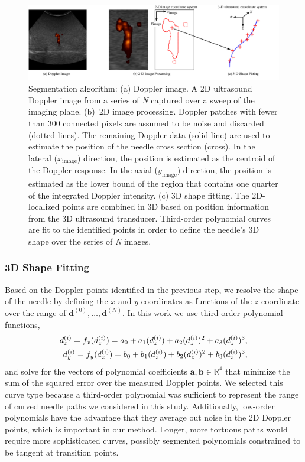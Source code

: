 \begin{figure}[!t]
\centering
\includegraphics[width = \textwidth]{Images/Chapter2/Segmentation/Segmentation}%
\caption{Segmentation algorithm: (a) Doppler image. A 2D ultrasound Doppler image from a series of \textit{N} captured over a sweep of the imaging plane. (b)~2D image processing. Doppler patches with fewer than 300 connected pixels are assumed to be noise and discarded (dotted lines). The remaining Doppler data (solid line) are used to estimate the position of the needle cross section (cross). In the lateral ($x_\text{image}$) direction, the position is estimated as the centroid of the Doppler response. In the axial ($y_\text{image}$) direction, the position is estimated as the lower bound of the region that contains one quarter of the integrated Doppler intensity. (c) 3D shape fitting. The 2D-localized points are combined in 3D based on position information from the 3D ultrasound transducer. Third-order polynomial curves are fit to the identified points in order to define the needle's 3D shape over the series of \textit{N} images.}
\label{fig:Segmentation}
\end{figure}

\subsubsection{3D Shape Fitting}
Based on the Doppler points identified in the previous step, we resolve the shape of the needle by defining the $x$ and $y$ coordinates as functions of the $z$ coordinate over the range of $\bm{d}^{(0)}, \dotsc, \bm{d}^{(N)}$. In this work we use third-order polynomial functions,
\begin{align}
d^{(i)}_x = f_x(d_z^{(i)}) = a_0 + a_1(d_z^{(i)}) + a_2(d_z^{(i)})^{2} + a_3(d_z^{(i)})^{3},\notag\\
d^{(i)}_y = f_y(d_z^{(i)}) = b_0 + b_1(d_z^{(i)}) + b_2(d_z^{(i)})^{2} + b_3(d_z^{(i)})^{3},\label{result}
\end{align}
and solve for the vectors of polynomial coefficients $\bm{a},\bm{b} \in \mathbb{R}^{4}$ that minimize the sum of the squared error over the measured Doppler points. We selected this curve type because a third-order polynomial was sufficient to represent the range of curved needle paths we considered in this study. Additionally, low-order polynomials have the advantage that they average out noise in the 2D Doppler points, which is important in our method. Longer, more tortuous paths would require more sophisticated curves, possibly segmented polynomials constrained to be tangent at transition points.

